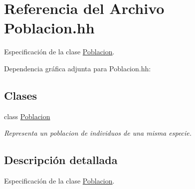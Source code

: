 \hypertarget{_poblacion_8hh}{}\section{Referencia del Archivo Poblacion.\+hh}
\label{_poblacion_8hh}


Especificación de la clase \hyperlink{class_poblacion}{Poblacion}.  


Dependencia gráfica adjunta para Poblacion.\+hh\+:
\subsection*{Clases}
\begin{DoxyCompactItemize}
\item 
class \hyperlink{class_poblacion}{Poblacion}
\begin{DoxyCompactList}\small\item\em Representa un poblacion de individuos de una misma especie. \end{DoxyCompactList}\end{DoxyCompactItemize}


\subsection{Descripción detallada}
Especificación de la clase \hyperlink{class_poblacion}{Poblacion}. 

